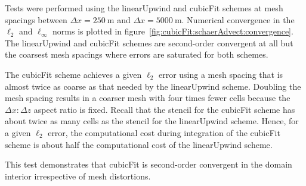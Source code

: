 Tests were performed using the linearUpwind and cubicFit schemes at mesh spacings between $\Delta x = \SI{250}{\meter}$ and $\Delta x = \SI{5000}{\meter}$.
Numerical convergence in the $\ell_2$ and $\ell_\infty$ norms is plotted in figure~\ref{fig:cubicFit:schaerAdvect:convergence}.
The linearUpwind and cubicFit schemes are second-order convergent at all but the coarsest mesh spacings where errors are saturated for both schemes.

The cubicFit scheme achieves a given $\ell_2$ error using a mesh spacing that is almost twice as coarse as that needed by the linearUpwind scheme.  Doubling the mesh spacing results in a coarser mesh with four times fewer cells because the $\Delta x \mathbin{:} \Delta z$ aspect ratio is fixed.
Recall that the stencil for the cubicFit scheme has about twice as many cells as the stencil for the linearUpwind scheme.
Hence, for a given $\ell_2$ error, the computational cost during integration of the cubicFit scheme is about half the computational cost of the linearUpwind scheme.

This test demonstrates that cubicFit is second-order convergent in the domain interior irrespective of mesh distortions.  
